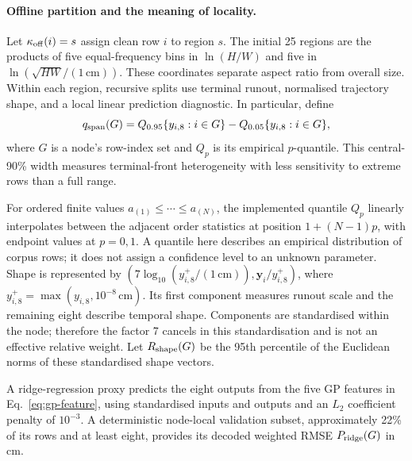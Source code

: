 \paragraph{Offline partition and the meaning of locality.}
Let $\kappa_{\rm off}(i)=s$ assign clean row $i$ to region $s$.
The initial 25 regions are the products of five equal-frequency bins
in $\ln(H/W)$ and five in $\ln(\sqrt{HW}/(1\,\mathrm{cm}))$.
These coordinates separate aspect ratio from overall size. Within each
region, recursive splits use terminal runout, normalised trajectory
shape, and a local linear prediction diagnostic. In particular, define
\begin{equation}
\label{eq:partition-span}
 q_{\rm span}(G)=Q_{0.95}\{y_{i,8}:i\in G\}
                 -Q_{0.05}\{y_{i,8}:i\in G\},
\end{equation}
where $G$ is a node's row-index set and $Q_p$ is its empirical
$p$-quantile. This central-90\% width measures terminal-front
heterogeneity with less sensitivity to extreme rows than a full range.

For ordered finite values $a_{(1)}\leq\cdots\leq a_{(N)}$, the
implemented quantile $Q_p$ linearly interpolates between the adjacent
order statistics at position $1+(N-1)p$, with endpoint values at
$p=0,1$. A quantile here describes an empirical distribution of corpus
rows; it does not assign a confidence level to an unknown parameter.
Shape is represented by
$(7\log_{10}(y_{i,8}^{+}/(1\,\mathrm{cm})),\mathbf y_i/y_{i,8}^{+})$,
where $y_{i,8}^{+}=\max(y_{i,8},10^{-8}\,\mathrm{cm})$.
Its first component measures runout scale and the remaining eight
describe temporal shape. Components are standardised within the node;
therefore the factor 7 cancels in this standardisation and is not an
effective relative weight. Let $R_{\rm shape}(G)$ be the 95th percentile
of the Euclidean norms of these standardised shape vectors.

A ridge-regression proxy predicts the eight outputs from the five GP
features in Eq.~\eqref{eq:gp-feature}, using standardised inputs and outputs and an
$L_2$ coefficient penalty of $10^{-3}$. A deterministic node-local
validation subset, approximately 22\% of its rows and at least eight,
provides its decoded weighted RMSE $P_{\rm ridge}(G)$ in cm.

